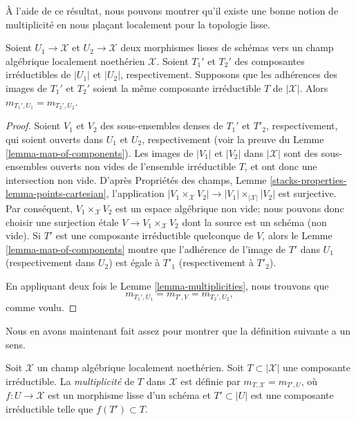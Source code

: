 \noindent
À l'aide de ce résultat, nous pouvons montrer qu'il existe une bonne notion
de multiplicité en nous plaçant localement pour la topologie lisse.

\begin{lemma}
\label{lemma-multiplicity}
Soient $U_1 \to \mathcal{X}$ et $U_2 \to \mathcal{X}$ deux morphismes lisses
de schémas vers un champ algébrique localement noethérien $\mathcal{X}$.
Soient $T_1'$ et $T_2'$ des composantes irréductibles de $|U_1|$
et $|U_2|$, respectivement. Supposons que les adhérences des images de
$T_1'$ et $T_2'$ soient la même composante irréductible $T$ de $|\mathcal{X}|$.
Alors $m_{T_1', U_1} = m_{T_2', U_2}$.
\end{lemma}

\begin{proof}
Soient $V_1$ et $V_2$ des sous-ensembles denses de $T_1'$ et $T'_2$, respectivement,
qui soient ouverts dans $U_1$ et $U_2$, respectivement (voir la preuve du
Lemme \ref{lemma-map-of-components}).
Les images de $|V_1|$ et $|V_2|$ dans $|\mathcal{X}|$ sont des sous-ensembles ouverts
non vides de l'ensemble irréductible $T$, et ont donc une intersection
non vide. D'après
Propriétés des champs, Lemme \ref{stacks-properties-lemma-points-cartesian},
l'application $|V_1 \times_\mathcal{X} V_2| \to |V_1| \times_{|\mathcal{X}|} |V_2|$
est surjective. Par conséquent, $V_1 \times_\mathcal{X} V_2$
est un espace algébrique non vide; nous pouvons donc choisir une
surjection étale $V \to V_1 \times_\mathcal{X} V_2$
dont la source est un schéma (non vide).
Si $T'$ est une composante irréductible quelconque de $V$,
alors le Lemme \ref{lemma-map-of-components} montre que l'adhérence de
l'image de $T'$ dans $U_1$ (respectivement dans $U_2$) est égale à $T'_1$
(respectivement à $T'_2$).

\medskip\noindent
En appliquant deux fois le Lemme \ref{lemma-multiplicities}, nous trouvons
que
$$
m_{T_1', U_1} = m_{T', V} = m_{T_2', U_2},
$$
comme voulu.
\end{proof}

\noindent
Nous en avons maintenant fait assez pour montrer que la définition
suivante a un sens.

\begin{definition}
\label{definition-multiplicity}
Soit $\mathcal{X}$ un champ algébrique localement noethérien. Soit
$T \subset |\mathcal{X}|$ une composante irréductible.
La {\it multiplicité} de $T$ dans $\mathcal{X}$ est définie par
$m_{T, \mathcal{X}} = m_{T', U}$, où $f : U \to \mathcal{X}$
est un morphisme lisse d'un schéma et $T' \subset |U|$
est une composante irréductible telle que $f(T') \subset T$.
\end{definition}

